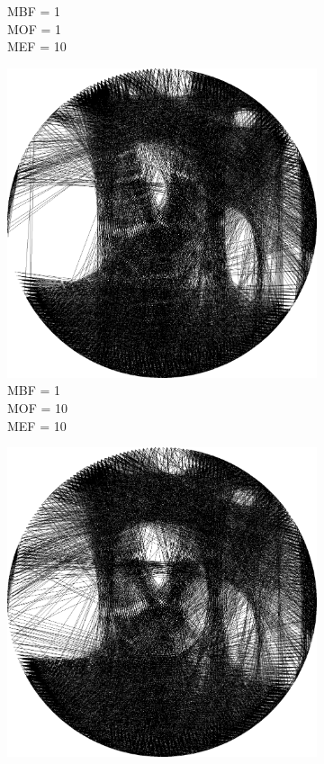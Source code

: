 \begin{figure}[htb]
\begin{subfigure}{0.24\textwidth}
        \caption{MBF = 1 \\ MOF = 1 \\ MEF = 10}
        \label{mine-param-taco-thread-f}
    \end{subfigure}
    \begin{subfigure}{0.24\textwidth}
        \centering
        \includegraphics[width = \textwidth]{img/4-mine/taco-thread/taco_e_i3000_c20_inv0_bg1_obj10_ed10.png}
        \caption{MBF = 1 \\ MOF = 10 \\ MEF = 10}
        \label{mine-param-taco-thread-g}
    \end{subfigure}
    \begin{subfigure}{0.24\textwidth}
        \centering
        \includegraphics[width = \textwidth]{img/4-mine/taco-thread/taco_e_i3000_c20_inv0_bg10_obj1_ed10.png}

\end{subfigure}
\end{figure}

